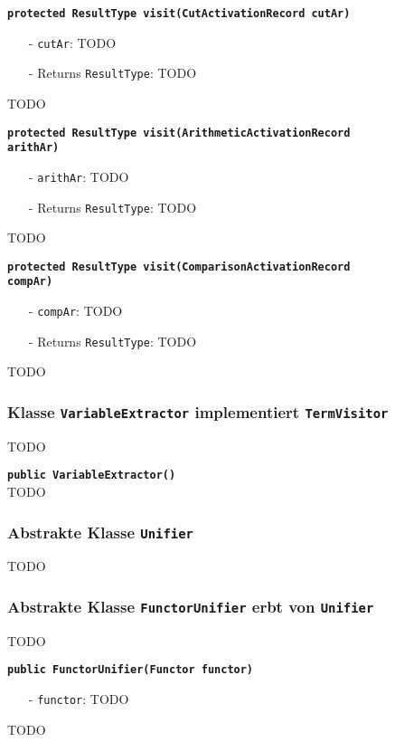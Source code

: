 \documentclass[parskip=full,11pt,twoside]{scrartcl}
\begin{document}
\textbf{\texttt{protected ResultType visit(CutActivationRecord cutAr)}}
\begin{itemize}[noitemsep]
	\item[-] \texttt{cutAr}: TODO
	\item[-] Returns \texttt{ResultType}: TODO
\end{itemize}
TODO

\textbf{\texttt{protected ResultType visit(ArithmeticActivationRecord\\arithAr)}}
\begin{itemize}[noitemsep]
	\item[-] \texttt{arithAr}: TODO
	\item[-] Returns \texttt{ResultType}: TODO
\end{itemize}
TODO

\textbf{\texttt{protected ResultType visit(ComparisonActivationRecord\\compAr)}}
\begin{itemize}[noitemsep]
	\item[-] \texttt{compAr}: TODO
	\item[-] Returns \texttt{ResultType}: TODO
\end{itemize}
TODO

\subsubsection{Klasse \texttt{VariableExtractor} implementiert \texttt{TermVisitor}}
TODO

\textbf{\texttt{public VariableExtractor()}}\\
TODO

\subsubsection{Abstrakte Klasse \texttt{Unifier}}
TODO

\subsubsection{Abstrakte Klasse \texttt{FunctorUnifier} erbt von \texttt{Unifier}}
TODO

\textbf{\texttt{public FunctorUnifier(Functor functor)}}
\begin{itemize}[noitemsep]
	\item[-] \texttt{functor}: TODO
\end{itemize}
TODO
\end{document}
